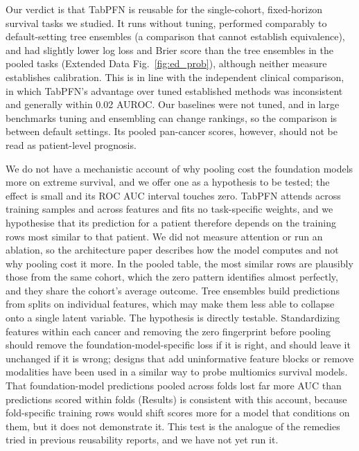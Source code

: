 \documentclass[11pt, a4paper, onecolumn, confidential, copyright]{hawkfranklin}
\begin{document}
Our verdict is that TabPFN is reusable for the single-cohort, fixed-horizon survival tasks we studied. It runs without tuning, performed comparably to default-setting tree ensembles (a comparison that cannot establish equivalence), and had slightly lower log loss and Brier score than the tree ensembles in the pooled tasks (Extended Data Fig.~\ref{fig:ed_prob}), although neither measure establishes calibration.\citep{van2019calibration} This is in line with the independent clinical comparison, in which TabPFN's advantage over tuned established methods was inconsistent and generally within 0.02 AUROC.\citep{shaktah2026established} Our baselines were not tuned, and in large benchmarks tuning and ensembling can change rankings,\citep{erickson2025tabarena} so the comparison is between default settings. Its pooled pan-cancer scores, however, should not be read as patient-level prognosis.

We do not have a mechanistic account of why pooling cost the foundation models more on extreme survival, and we offer one as a hypothesis to be tested; the effect is small and its ROC AUC interval touches zero. TabPFN attends across training samples and across features and fits no task-specific weights,\citep{hollmann2025accurate} and we hypothesise that its prediction for a patient therefore depends on the training rows most similar to that patient. We did not measure attention or run an ablation, so the architecture paper describes how the model computes and not why pooling cost it more. In the pooled table, the most similar rows are plausibly those from the same cohort, which the zero pattern identifies almost perfectly, and they share the cohort's average outcome. Tree ensembles build predictions from splits on individual features,\citep{breiman2001random,chen2016xgboost} which may make them less able to collapse onto a single latent variable. The hypothesis is directly testable. Standardizing features within each cancer and removing the zero fingerprint before pooling should remove the foundation-model-specific loss if it is right, and should leave it unchanged if it is wrong; designs that add uninformative feature blocks or remove modalities have been used in a similar way to probe multiomics survival models.\citep{wissel2023systematic} That foundation-model predictions pooled across folds lost far more AUC than predictions scored within folds (Results) is consistent with this account, because fold-specific training rows would shift scores more for a model that conditions on them, but it does not demonstrate it. This test is the analogue of the remedies tried in previous reusability reports, and we have not yet run it.
\end{document}
